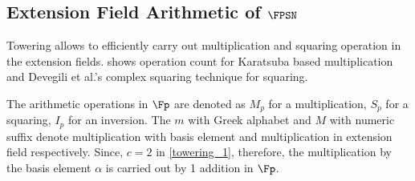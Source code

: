 \subsection{Extension Field Arithmetic of $\FPSN$}
Towering allows to efficiently carry out multiplication and squaring operation in the extension fields.
 shows operation count for Karatsuba based multiplication and Devegili et al.'s \cite{EPRINT:DOSD06} complex squaring technique for squaring. 
\renewcommand{\baselinestretch}{1.5}
\begin{table}[t]
\caption{Number of arithmetic operations in  $\FPSN$ based on Type-I towering \eqref{towering_1}.}
\label{tab_fpoperation}
	\centering
\end{table}
\renewcommand{\baselinestretch}{1.0}
The arithmetic operations in $\Fp$ are denoted as $M_p$ for a multiplication, $S_p$ for a squaring, $I_p$ for an inversion.
The $m$ with Greek alphabet and $M$ with numeric suffix denote multiplication with basis element and multiplication in extension field respectively.
Since, $c=2$ in \eqref{towering_1}, therefore, the multiplication by the basis element $\alpha$ is carried out by 1 addition in $\Fp$.


